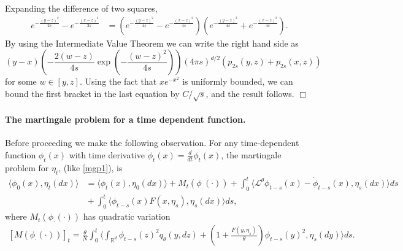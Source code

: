 \documentclass[12pt]{article}
\newenvironment {proof}{{\noindent\bf Proof }}{\hfill $\Box$ \medskip}
\newcommand{\IR}{\mathbb R}
\newcommand{\comment}[1]{{\color{blue} \it #1}}
\begin{document}
\begin{proof}
    Expanding the difference of two squares,
    \begin{align*}
        e^{- \frac{(y-z)^2}{2 s}}
        -
        e^{- \frac{(x-z)^2}{2 s}}
        &=
        \left(
            e^{-\frac{(y-z)^2}{4 s}}
            -
            e^{-\frac{(x-z)^2}{4 s}}
        \right)
        \left(
            e^{-\frac{(y-z)^2}{4 s}}
            +
            e^{-\frac{(x-z)^2}{4 s}}
        \right) .
    \end{align*}
    By using the Intermediate Value Theorem we can write the right hand side as
    \[
        (y-x)
        \left( - \frac{2(w-z)}{4s} \exp\left(-\frac{(w-z)^2}{4s}\right)\right)
        (4 \pi s)^{d/2}
        \left( p_{2s}(y,z)+p_{2s}(x,z) \right)
    \]
    for some $w \in [y,z]$.
    Using the fact that $x e^{-x^2}$ is uniformly bounded,
    we can bound the first bracket in the last equation by $C/\sqrt{s}$, and the result follows.
\end{proof}

\paragraph{The martingale problem for a time dependent function.}
Before proceeding we make the following observation.
For any time-dependent function $\phi_t(x)$
with time derivative $\dot \phi_t(x) = \frac{d}{dt} \phi_t(x)$,
the martingale problem for $\eta_t$, (like \ref{mgp1}),
is
\begin{align}
        \label{timeMGP}
    \langle \phi_0(x), \eta_t(dx) \rangle
    &= \nonumber 
    \langle \phi_t(x), \eta_0(dx) \rangle
    +
    M_t(\phi_\cdot(\cdot))
    +
    \int_0^t \langle \mathcal{L}^\theta \phi_{t-s}(x) - \dot \phi_{t-s}(x), \eta_s(dx) \rangle ds
    \\ & {}
    +
    \int_{0}^t \langle \phi_{t-s}(x) F(x, \eta_s) , \eta_s(dx) \rangle ds ,
\end{align}
where $M_t(\phi_\cdot(\cdot))$ has quadratic variation
\begin{align}
        \label{timeMGP2}
    [M(\phi_\cdot(\cdot))]_t
    =
    \frac{\theta}{N} \int_0^t \langle
        \int_{\IR^d} \phi_{t-s}(z)^2 q_\theta(y,dz)
        +
        \left( 1 + \frac{F(y, \eta_s)}{\theta}\right) \phi_{t-s}(y)^2,
    \eta_s(dy) \rangle ds .
\end{align}
\end{document}
